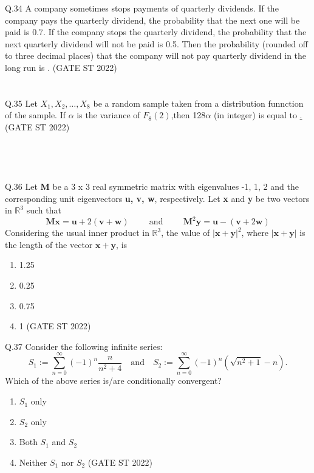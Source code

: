 \documentclass[journal,12pt,onecolumn]{IEEEtran}
\theoremstyle{remark}
\begin{document}
Q.34 A company sometimes stops payments of quarterly dividends. If the company pays the quarterly dividend, the probability that the next one will be paid is 0.7. If the  company stops the quarterly dividend, the probability that the next quarterly dividend will not be paid is 0.5. Then the probability (rounded off to three decimal places) that the company will not pay quarterly dividend in the long run is \underline{\hspace{2cm}}. \hfill (GATE ST 2022)\\
\\
\\
Q.35 Let $X_1,X_2, \dots,X_8$ be a random sample taken from a distribution funnction of the sample. If $\alpha$ is the variance of $F_8(2)$,then 128$\alpha$ (in integer) is equal to \underline{\hspace{2cm}.}\hfill (GATE ST 2022)\\
\\
\pagebreak
\\
\\
\\
Q.36 Let \textbf{M} be a 3 x 3 real symmetric matrix with eigenvalues -1, 1, 2 and the corresponding unit eigenvectors \textbf{u, v, w}, respectively. Let \textbf{x} and \textbf{y} be two vectors in $\mathbb{R}^3$ such that
\[
\mathbf{M} \mathbf{x} = \mathbf{u} + 2(\mathbf{v} + \mathbf{w}) \hspace{1cm} \text{and} \hspace{1cm} \mathbf{M}^2\mathbf{y} = \mathbf{u} -(\mathbf{v} + 2\mathbf{w})
\]
Considering the usual inner product in $\mathbb{R}^3$, the value of ${|\mathbf{x} + \mathbf{y}|}^2$, where $|\mathbf{x} + \mathbf{y}|$ is the length of the vector $\mathbf{x + y}$, is
\begin{enumerate}[label=\Alph*.] 
	\item 1.25
	\item 0.25
	\item 0.75
	\item 1
	\hfill (GATE ST 2022)
\end{enumerate}
	\vspace{2em}
Q.37 Consider the following infinite series:
\[
S_1 := \sum_{n=0}^{\infty} (-1)^n \frac{n}{n^2 + 4} \quad \text{and} \quad 
S_2 := \sum_{n=0}^{\infty} (-1)^n \left(\sqrt{n^2 + 1} - n \right).
\]
Which of the above series is/are conditionally convergent?
\begin{enumerate}[label=\Alph*.] 
	\item $S_1$ only
	\item $S_2$ only
	\item Both $S_1$ and $S_2$
	\item Neither $S_1$ nor $S_2$
	\hfill (GATE ST 2022)
\end{enumerate}
\end{document}
